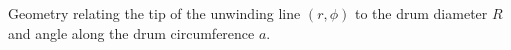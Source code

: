 \label{fig:geometry} Geometry relating the tip of the unwinding line $(r,\phi)$ to the drum diameter $R$ and angle along the drum circumference $a$.